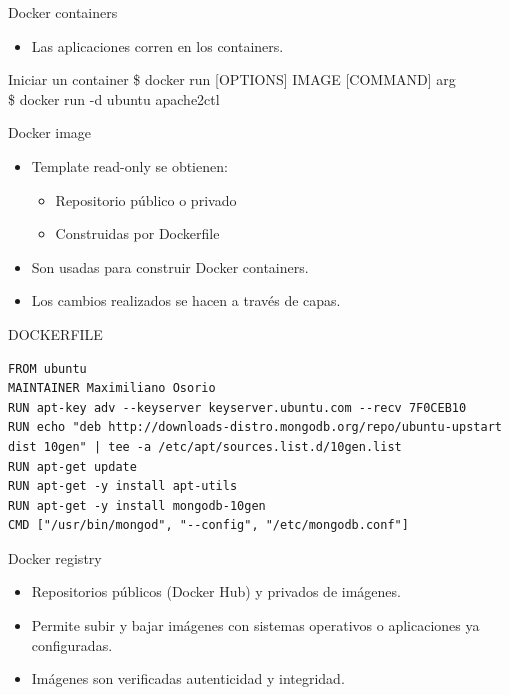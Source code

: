 \documentclass[compress]{beamer}
\begin{document}
\begin{frame}{Docker containers}

\begin{itemize}
	\item Las aplicaciones corren en los containers.
\end{itemize}
	
	
	\begin{exampleblock}{Iniciar un container}
		\$ docker run [OPTIONS] IMAGE [COMMAND] arg\\
		\$ docker run -d ubuntu apache2ctl
	\end{exampleblock}
\end{frame}


\begin{frame}{Docker image}
\begin{itemize}
	\item Template read-only se obtienen:
	\begin{itemize}
		\item Repositorio público o privado
		\item Construidas por Dockerfile
	\end{itemize}
	\item Son usadas para construir Docker containers.
	\item Los cambios realizados se hacen a través de capas.
\end{itemize}
\begin{figure}[H]
  \centering
\end{figure}	
\end{frame}


\begin{frame}[containsverbatim]{DOCKERFILE}
\begin{lstlisting}
FROM ubuntu
MAINTAINER Maximiliano Osorio
RUN apt-key adv --keyserver keyserver.ubuntu.com --recv 7F0CEB10
RUN echo "deb http://downloads-distro.mongodb.org/repo/ubuntu-upstart dist 10gen" | tee -a /etc/apt/sources.list.d/10gen.list
RUN apt-get update
RUN apt-get -y install apt-utils
RUN apt-get -y install mongodb-10gen
CMD ["/usr/bin/mongod", "--config", "/etc/mongodb.conf"] 
\end{lstlisting}
\end{frame}




\begin{frame}{Docker registry}
\begin{itemize}
	\item Repositorios públicos (Docker Hub) y privados de imágenes.
	\item Permite subir y bajar imágenes con sistemas operativos o aplicaciones ya configuradas.
	\item Imágenes son verificadas autenticidad y integridad.	
\end{itemize}
\end{frame}
\end{document}
